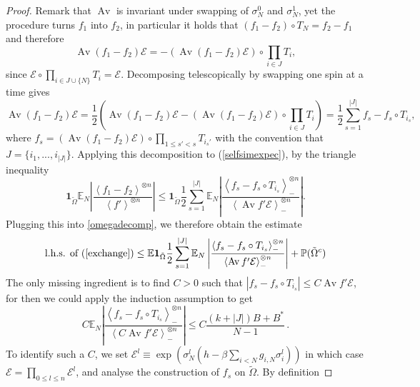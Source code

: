\documentclass[a4paper,12pt,oneside,reqno]{amsart}
\numberwithin{equation}{section}
\begin{document}
\begin{proof}
Remark that $\operatorname{Av}$ is invariant under swapping of $\sigma_N^0$ and $\sigma_N^1$, yet the procedure 
turns $f_1$ into $f_2$, in particular it holds that $\left(f_1-f_2\right)\circ T_N = f_2-f_1$ and therefore 
$$ \operatorname{Av} \left(f_1-f_2 \right) \mathcal{E} = - \left(\operatorname{Av} \left(f_1-f_2 \right) \mathcal{E}\right)\circ \prod\limits_{i\in J} T_i,$$
since $\mathcal{E}\circ \prod\limits_{i\in J\cup \{N\}}  T_i = \mathcal{E}$. Decomposing telescopically by swapping one spin at a time gives  
\begin{equation}\label{decompfs} \operatorname{Av} \left(f_1-f_2 \right) \mathcal{E} = \frac{1}{2}(\operatorname{Av} \left(f_1-f_2 \right) \mathcal{E}- (\operatorname{Av} \left(f_1-f_2 \right) \mathcal{E})\circ \prod\limits_{i\in J} T_i) =  \frac{1}{2}\sum\limits_{s=1}^{|J|} f_s-f_s\circ T_{i_s},\end{equation} 
where  $f_s = (\operatorname{Av} \left(f_1-f_2 \right) \mathcal{E})\circ \prod\limits_{1\leq s' < s} T_{i_s'}$ with the convention that $J = \{i_1,...,i_{|J|}\}$. 
Applying this decomposition to (\ref{selfsimexpec}), by the triangle inequality
$$\textbf{1}_{\tilde  \Omega}{{\mathbb{E}}}_{N}\left|\frac{\left<f_1-f_2 \right>^{\otimes n}}{\left<f' \right>^{\otimes n}}\right| \leq \textbf{1}_{\tilde \Omega} \frac{1}{2}\sum\limits_{s=1}^{|J|}{{\mathbb{E}}}_{N}\left|\frac{\left< f_s-f_s\circ T_{i_s}\right>_{-}^{\otimes n}}{\left<\operatorname{Av} f' \mathcal{E}\right>_{-}^{\otimes n}}\right|.$$
Plugging this into \eqref{omegadecomp}, we therefore obtain the estimate
\begin{equation}\label{estimateviadecomp}\text{l.h.s. of } (\ref{exchange}) \leq {{\mathbb{E}}}\textbf{1}_{\tilde \Omega} \frac{1}{2}\sum\limits_{s=1}^{|J|}{{\mathbb{E}}}_{N}\left|\frac{\left< f_s-f_s\circ T_{i_s}\right>_{-}^{\otimes n}}{\left<\operatorname{Av} f' \mathcal{E}\right>_{-}^{\otimes n}}\right| + {\mathbb{P}}(\tilde \Omega^c)\end{equation}
The only missing ingredient is to find $C>0$ such that $| f_s-f_s\circ T_{i_s}|\leq C \operatorname{Av} f' \mathcal{E}$, for then we could apply the induction assumption to get 
\begin{equation}\label{whatCdoes} C {{\mathbb{E}}}_{N}\left|\frac{\left< f_s-f_s\circ T_{i_s}\right>_{-}^{\otimes n}}{\left<C \operatorname{Av} f' \mathcal{E}\right>_{-}^{\otimes n}}\right| \leq C \frac{\left(k+|J|\right)B+B^*}{N-1} \,.
\end{equation}
To identify such a $C$, we set $\mathcal{E}^l {\equiv} \exp(\sigma^l_N (h-\beta\sum\limits_{i<N} g_{i,N}\sigma_i^l) )$ in which case $\mathcal{E}= \prod\limits_{0\leq l\leq n}\mathcal{E}^l$, and analyse the construction of $f_s$ on $\tilde{\Omega}$. By definition

\end{proof}
\end{document}
